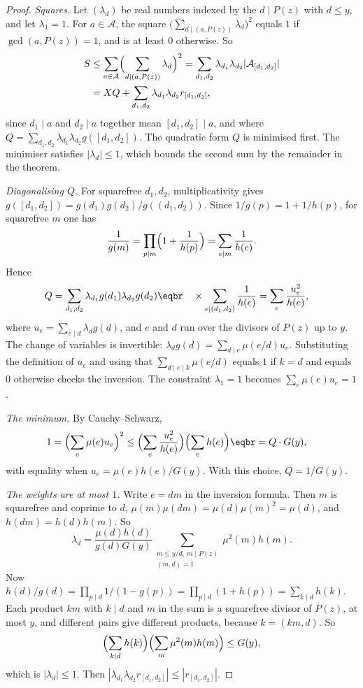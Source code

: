 \begin{proof}
\emph{Squares.} Let $(\lambda_d)$ be real numbers indexed by the $d\mid P(z)$ with $d\le y$, and let $\lambda_1=1$. For $a\in\mathcal A$, the square $\bigl(\sum_{d\mid(a,P(z))}\lambda_d\bigr)^2$ equals $1$ if $\gcd(a,P(z))=1$, and is at least $0$ otherwise. So
\[
\begin{aligned}S&\le\sum_{a\in\mathcal A}\Bigl(\sum_{d\mid(a,P(z))}\lambda_d\Bigr)^2=\sum_{d_1,d_2}\lambda_{d_1}\lambda_{d_2}|\mathcal A_{[d_1,d_2]}|\\&=XQ+\sum_{d_1,d_2}\lambda_{d_1}\lambda_{d_2}r_{[d_1,d_2]},\end{aligned}
\]
since $d_1\mid a$ and $d_2\mid a$ together mean $[d_1,d_2]\mid a$, and where $Q=\sum_{d_1,d_2}\lambda_{d_1}\lambda_{d_2}g([d_1,d_2])$. The quadratic form $Q$ is minimised first. The minimiser satisfies $|\lambda_d|\le1$, which bounds the second sum by the remainder in the theorem.

\emph{Diagonalising $Q$.} For squarefree $d_1,d_2$, multiplicativity gives $g([d_1,d_2])=g(d_1)g(d_2)/g((d_1,d_2))$. Since $1/g(p)=1+1/h(p)$, for squarefree $m$ one has
\[
\frac1{g(m)}=\prod_{p\mid m}\Bigl(1+\frac1{h(p)}\Bigr)=\sum_{e\mid m}\frac1{h(e)}.
\]
Hence
\[
\begin{aligned}Q&=\sum_{d_1,d_2}\lambda_{d_1}g(d_1)\lambda_{d_2}g(d_2)\eqbr\quad\times\sum_{e\mid(d_1,d_2)}\frac1{h(e)}=\sum_e\frac{u_e^2}{h(e)},\end{aligned}
\]
where $u_e=\sum_{e\mid d}\lambda_dg(d)$, and $e$ and $d$ run over the divisors of $P(z)$ up to $y$. The change of variables is invertible: $\lambda_dg(d)=\sum_{d\mid e}\mu(e/d)u_e$. Substituting the definition of $u_e$ and using that $\sum_{d\mid e\mid k}\mu(e/d)$ equals $1$ if $k=d$ and equals $0$ otherwise checks the inversion. The constraint $\lambda_1=1$ becomes $\sum_e\mu(e)u_e=1$.

\emph{The minimum.} By Cauchy--Schwarz,
\[
\begin{aligned}1=\Bigl(\sum_e\mu(e)u_e\Bigr)^2&\le\Bigl(\sum_e\frac{u_e^2}{h(e)}\Bigr)\Bigl(\sum_eh(e)\Bigr)\eqbr=Q\cdot G(y),\end{aligned}
\]
with equality when $u_e=\mu(e)h(e)/G(y)$. With this choice, $Q=1/G(y)$.

\emph{The weights are at most $1$.} Write $e=dm$ in the inversion formula. Then $m$ is squarefree and coprime to $d$, $\mu(m)\mu(dm)=\mu(d)\mu(m)^2=\mu(d)$, and $h(dm)=h(d)h(m)$. So
\[
\lambda_d=\frac{\mu(d)h(d)}{g(d)G(y)}\sum_{\substack{m\le y/d,\ m\mid P(z)\\(m,d)=1}}\mu^2(m)h(m).
\]
Now $h(d)/g(d)=\prod_{p\mid d}1/(1-g(p))=\prod_{p\mid d}(1+h(p))=\sum_{k\mid d}h(k)$. Each product $km$ with $k\mid d$ and $m$ in the sum is a squarefree divisor of $P(z)$, at most $y$, and different pairs give different products, because $k=(km,d)$. So
\[
\Bigl(\sum_{k\mid d}h(k)\Bigr)\Bigl(\sum_m\mu^2(m)h(m)\Bigr)\le G(y),
\]
which is $|\lambda_d|\le1$. Then $|\lambda_{d_1}\lambda_{d_2}r_{[d_1,d_2]}|\le|r_{[d_1,d_2]}|$.
\end{proof}

